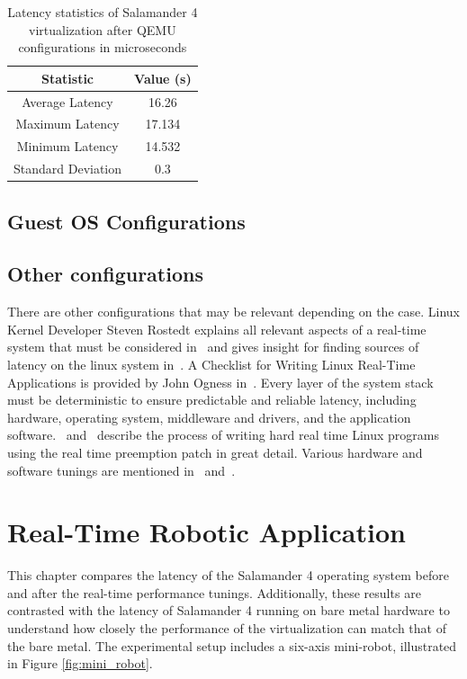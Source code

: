 \documentclass[MMR,Master,english]{twbook}
\begin{document}
	\begin{table}[H]
		\centering
		\caption[Latency statistics of Salamander 4 after QEMU configurations]{Latency statistics of Salamander 4 virtualization after QEMU configurations in microseconds}
		\label{tab:latency_statistics_virt}
		\setlength{\tabcolsep}{0.5em} %
		{\renewcommand{\arraystretch}{1.2}%
		\begin{tabular}{|c|c|}\hline
		\textbf{Statistic} & \textbf{Value (\textmu s)} \\\hline
		Average Latency & 16.26 \\\hline
		Maximum Latency & 17.134 \\\hline
		Minimum Latency & 14.532 \\\hline
		Standard Deviation & 0.3 \\\hline
		\end{tabular}}
		\end{table}


\section{Guest OS Configurations}


\section{Other configurations}
There are other configurations that may be relevant depending on the case. Linux Kernel Developer Steven Rostedt explains all relevant aspects of a real-time system that must be considered in~\cite{kernelrecipesKernelRecipes20162016} and gives insight for finding sources of latency on the linux system in~\cite{thelinuxfoundationFindingSourcesLatency2020}. A Checklist for Writing Linux Real-Time Applications is provided by John Ogness in~\cite{thelinuxfoundationChecklistWritingLinux2020}. Every layer of the system stack must be deterministic to ensure predictable and reliable latency, including hardware, operating system, middleware and drivers, and the application software.~\cite{HOWTOBuildRTapplication} and~\cite{RealtimeProgrammingLinux} describe the process of writing hard real time Linux programs using the real time preemption patch in great detail. Various hardware and software tunings are mentioned in~\cite{KVMQemuVirtualization} and~\cite{RealTimePerformanceTuning2022}.

\clearpage

\chapter{Real-Time Robotic Application}\label{cha:real-time-testing}
This chapter compares the latency of the Salamander 4 operating system before and after the real-time performance tunings. Additionally, these results are contrasted with the latency of Salamander 4 running on bare metal hardware to understand how closely the performance of the virtualization can match that of the bare metal. The experimental setup includes a six-axis mini-robot, illustrated in Figure \ref{fig:mini_robot}. 
\end{document}
